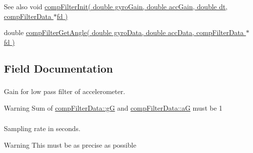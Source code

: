 \begin{DoxySeeAlso}{\-See also}
void \hyperlink{complementary_filter_8h_abad2b002cd583707936c98c7a3090345}{comp\-Filter\-Init( double gyro\-Gain, double acc\-Gain, double dt, comp\-Filter\-Data $\ast$fd )} 

double \hyperlink{complementary_filter_8h_a6a4bfcbdce868ceba526c9289952ea3d}{comp\-Filter\-Get\-Angle( double gyro\-Data, double acc\-Data, comp\-Filter\-Data $\ast$fd )} 
\end{DoxySeeAlso}


\subsection{\-Field \-Documentation}
\hypertarget{structcomp_filter_data_afa9cf053cc3f14e6f45db1326dd4faa1}{
\subsubsection[{a\-G}]{}}\label{structcomp_filter_data_afa9cf053cc3f14e6f45db1326dd4faa1}


\-Gain for low pass filter of accelerometer. 

\begin{DoxyWarning}{\-Warning}
\-Sum of \hyperlink{structcomp_filter_data_a15c4d386f5a6e782dccc9b419633bc82}{comp\-Filter\-Data\-::g\-G} and \hyperlink{structcomp_filter_data_afa9cf053cc3f14e6f45db1326dd4faa1}{comp\-Filter\-Data\-::a\-G} must be 1 
\end{DoxyWarning}
\hypertarget{structcomp_filter_data_a770f288d3048ff6cbee9faa0969fd6b0}{
\subsubsection[{dt}]{}}\label{structcomp_filter_data_a770f288d3048ff6cbee9faa0969fd6b0}


\-Sampling rate in seconds. 

\begin{DoxyWarning}{\-Warning}
\-This must be as precise as possible 
\end{DoxyWarning}
\hypertarget{structcomp_filter_data_a15c4d386f5a6e782dccc9b419633bc82}{
\subsubsection[{g\-G}]{}}\label{structcomp_filter_data_a15c4d386f5a6e782dccc9b419633bc82}


